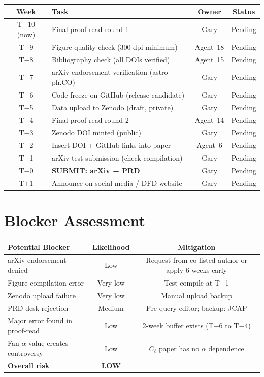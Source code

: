 \documentclass[11pt,a4paper]{article}
\begin{document}
\begin{center}
\begin{longtable}{clcc}
\toprule
\textbf{Week} & \textbf{Task} & \textbf{Owner} & \textbf{Status} \\
\midrule
T$-$10 (now) & Final proof-read round 1 & Gary & Pending \\
T$-$9 & Figure quality check (300 dpi minimum) & Agent~18 & Pending \\
T$-$8 & Bibliography check (all DOIs verified) & Agent~15 & Pending \\
T$-$7 & arXiv endorsement verification (astro-ph.CO) & Gary & Pending \\
T$-$6 & Code freeze on GitHub (release candidate) & Gary & Pending \\
T$-$5 & Data upload to Zenodo (draft, private) & Gary & Pending \\
T$-$4 & Final proof-read round 2 & Agent~14 & Pending \\
T$-$3 & Zenodo DOI minted (public) & Gary & Pending \\
T$-$2 & Insert DOI + GitHub links into paper & Agent~6 & Pending \\
T$-$1 & arXiv test submission (check compilation) & Gary & Pending \\
T$-$0 & \textbf{SUBMIT: arXiv + PRD} & Gary & Pending \\
T$+$1 & Announce on social media / DFD website & Gary & Pending \\
\bottomrule
\end{longtable}
\end{center}

\section{Blocker Assessment}

\begin{center}
\begin{tabular}{lcc}
\toprule
\textbf{Potential Blocker} & \textbf{Likelihood} & \textbf{Mitigation} \\
\midrule
arXiv endorsement denied & Low & Request from co-listed author or apply 6 weeks early \\
Figure compilation error & Very low & Test compile at T$-$1 \\
Zenodo upload failure & Very low & Manual upload backup \\
PRD desk rejection & Medium & Pre-query editor; backup: JCAP \\
Major error found in proof-read & Low & 2-week buffer exists (T$-$6 to T$-$4) \\
Fan $\alpha$ value creates controversy & Low & $C_\ell$ paper has no $\alpha$ dependence \\
\midrule
\textbf{Overall risk} & \textbf{LOW} & \\
\bottomrule
\end{tabular}
\end{center}
\end{document}
